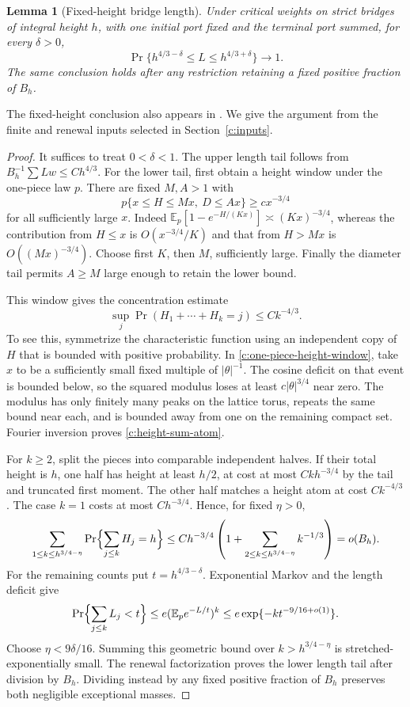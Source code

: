 \documentclass[11pt]{article}
\numberwithin{equation}{section}
\newtheorem{lemma}[theorem]{Lemma}
\theoremstyle{definition}\newtheorem{definition}[theorem]{Definition}
\theoremstyle{remark}\newtheorem{remark}[theorem]{Remark}
\begin{document}
\begin{lemma}[Fixed-height bridge length]\label{c:fixed-height-window}
Under critical weights on strict bridges of integral height $h$, with
one initial port fixed and the terminal port summed, for every $\delta>0$,
\[
 \Pr\{h^{4/3-\delta}\le L\le h^{4/3+\delta}\}\longrightarrow1.
\]
The same conclusion holds after any restriction retaining a fixed positive
fraction of $B_h$.
\end{lemma}
The fixed-height conclusion also appears in
\cite[Proposition 5.7]{Renewal}. We give the argument from the finite
and renewal inputs selected in Section~\ref{c:inputs}.
\begin{proof}
It suffices to treat $0<\delta<1$. The upper length tail follows from
$B_h^{-1}\sum Lw\le Ch^{4/3}$. For the lower tail, first obtain a
height window under the one-piece law $p$. There are fixed $M,A>1$ with
\begin{equation}\label{c:one-piece-height-window}
 p\{x\le H\le Mx,\ D\le Ax\}\ge cx^{-3/4}
\end{equation}
for all sufficiently large $x$. Indeed
$\mathbb E_p[1-e^{-H/(Kx)}]\asymp(Kx)^{-3/4}$, whereas the contribution
from $H\le x$ is $O(x^{-3/4}/K)$ and that from $H>Mx$ is
$O((Mx)^{-3/4})$. Choose first $K$, then $M$, sufficiently large.
Finally the diameter tail permits $A\ge M$ large enough to retain the
lower bound.

This window gives the concentration estimate
\begin{equation}\label{c:height-sum-atom}
 \sup_j\Pr(H_1+\cdots+H_k=j)\le Ck^{-4/3}.
\end{equation}
To see this, symmetrize the characteristic function using an independent
copy of $H$ that is bounded with positive probability. In
\eqref{c:one-piece-height-window}, take $x$ to be a sufficiently small
fixed multiple of $|\theta|^{-1}$. The cosine deficit on that event is
bounded below, so the squared modulus loses at least
$c|\theta|^{3/4}$ near zero. The modulus has only finitely many peaks
on the lattice torus, repeats the same bound near each, and is bounded
away from one on the remaining compact set. Fourier inversion proves
\eqref{c:height-sum-atom}.

For $k\ge2$, split the pieces into comparable independent halves.
If their total height is $h$, one half has height at least $h/2$, at
cost at most $Ckh^{-3/4}$ by the tail and truncated first moment.
The other half matches a height atom at cost $Ck^{-4/3}$. The case
$k=1$ costs at most $Ch^{-3/4}$. Hence, for fixed $\eta>0$,
\[
 \sum_{1\le k\le h^{3/4-\eta}}
 \Pr\Bigl\{\sum_{j\le k}H_j=h\Bigr\}
 \le Ch^{-3/4}\left(1+
       \sum_{2\le k\le h^{3/4-\eta}}k^{-1/3}\right)
 =o(B_h).
\]
For the remaining counts put $t=h^{4/3-\delta}$. Exponential Markov
and the length deficit give
\[
 \Pr\Bigl\{\sum_{j\le k}L_j<t\Bigr\}
 \le e(\mathbb E_p e^{-L/t})^k
 \le e\exp\{-k t^{-9/16+o(1)}\}.
\]
Choose $\eta<9\delta/16$. Summing this geometric bound over
$k>h^{3/4-\eta}$ is stretched-exponentially small. The renewal
factorization proves the lower length tail after division by $B_h$.
Dividing instead by any fixed positive fraction of $B_h$ preserves
both negligible exceptional masses.
\end{proof}
\end{document}
